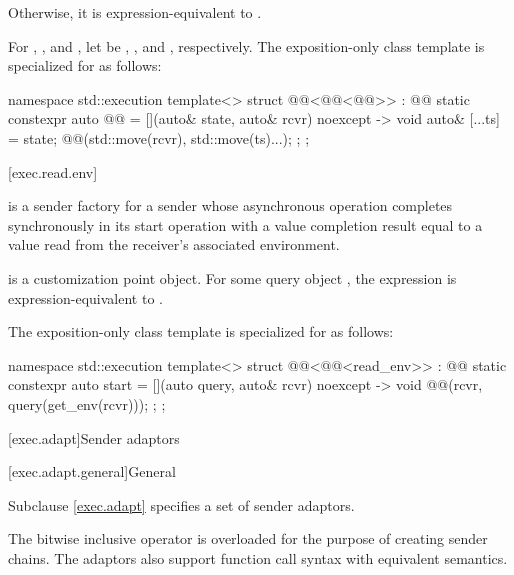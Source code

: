 Otherwise, it is expression-equivalent to
.

For , , and ,
let  be
, , and , respectively.
The exposition-only class template 
is specialized for  as follows:
\begin{codeblock}
namespace std::execution {
  template<>
  struct @@<@@<@@>> : @@ {
    static constexpr auto @@ =
      [](auto& state, auto& rcvr) noexcept -> void {
        auto& [...ts] = state;
        @@(std::move(rcvr), std::move(ts)...);
      };
  };
}
\end{codeblock}

[exec.read.env]{}

\pnum
{} is a sender factory for a sender
whose asynchronous operation completes synchronously in its start operation
with a value completion result equal to
a value read from the receiver's associated environment.

\pnum
{} is a customization point object.
For some query object ,
the expression  is expression-equivalent to
.

\pnum
The exposition-only class template 
is specialized for  as follows:
\begin{codeblock}
namespace std::execution {
  template<>
  struct @@<@@<read_env>> : @@ {
    static constexpr auto start =
      [](auto query, auto& rcvr) noexcept -> void {
        @@(rcvr, query(get_env(rcvr)));
      };
  };
}
\end{codeblock}

[exec.adapt]{Sender adaptors}

[exec.adapt.general]{General}

\pnum
Subclause \ref{exec.adapt} specifies a set of sender adaptors.

\pnum
The bitwise inclusive  operator is overloaded
for the purpose of creating sender chains.
The adaptors also support function call syntax with equivalent semantics.

